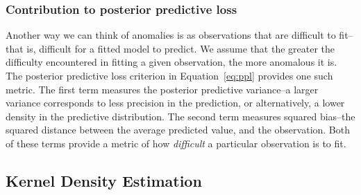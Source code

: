 \subsubsection{Contribution to posterior predictive loss}
Another way we can think of anomalies is as observations that are difficult to fit--that is, difficult
    for a fitted model to predict.  We assume that the greater the difficulty encountered in fitting a
    given observation, the more anomalous it is.  The posterior predictive loss criterion in
    Equation~\ref{eq:ppl} provides one such metric.  The first term measures the posterior predictive
    variance--a larger variance corresponds to less precision in the prediction, or alternatively, a lower
    density in the predictive distribution.  The second term measures squared bias--the squared distance
    between the average predicted value, and the observation.  Both of these terms provide a metric of
    how \emph{difficult} a particular observation is to fit.

\subsection{Kernel Density Estimation}

\begin{equation}
    
    
\end{equation}







